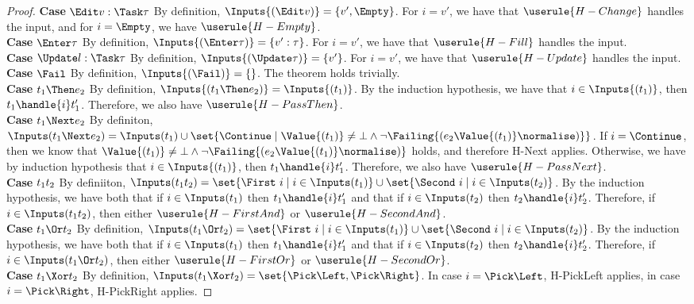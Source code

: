 \begin{proof}
  \noindent\textbf{Case} $\Edit v:\Task\tau$ By definition, $\Inputs{(\Edit v)}=\{v',\Empty\}$. For $i=v'$, we have that $\userule{H-Change}$ handles the input, and for $i=\Empty$, we have $\userule{H-Empty}$.\\

  \noindent\textbf{Case} $\Enter \tau$ By definition, $\Inputs{(\Enter \tau)}=\{v':\tau\}$. For $i=v'$, we have that $\userule{H-Fill}$ handles the input.\\

  \noindent\textbf{Case} $\Update l:\Task\tau$ By definition, $\Inputs{(\Update\tau)}=\{v'\}$. For $i=v'$, we have that $\userule{H-Update}$ handles the input.\\

  \noindent\textbf{Case} $\Fail$ By definition, $\Inputs{(\Fail)}=\{\}$. The theorem holds trivially.\\

  \noindent\textbf{Case} $t_1\Then e_2$ By definition, $\Inputs{(t_1\Then e_2)}=\Inputs{(t_1)}$. By the induction hypothesis, we have that $i\in\Inputs{(t_1)}$, then $t_1\handle{i}t_1'$. Therefore, we also have $\userule{H-PassThen}$.\\

  \noindent\textbf{Case} $t_1\Next e_2$ By definiton, $\Inputs(t_1 \Next e_2) = \Inputs(t_1) \cup \set{\Continue\mid \Value{(t_1)}\neq \bot \wedge \neg\Failing{(e_2 \Value{(t_1)}\normalise)}}$. If $i=\Continue$, then we know that $\Value{(t_1)}\neq \bot \wedge \neg\Failing{(e_2 \Value{(t_1)}\normalise)}$ holds, and therefore H-Next applies. Otherwise, we have by induction hypothesis that $i\in\Inputs{(t_1)}$, then $t_1\handle{i}t_1'$. Therefore, we also have $\userule{H-PassNext}$.\\

  \noindent\textbf{Case} $t_1\relax t_2$ By definiiton, $\Inputs(t_1\And t_2) = \set{\First\ i \mid i \in \Inputs(t_1)} \cup \set{\Second\ i \mid i \in \Inputs(t_2)}$. By the induction hypothesis, we have both that if $i\in\Inputs(t_1)$ then $t_1\handle{i}t_1'$ and that if $i\in\Inputs(t_2)$ then $t_2\handle{i}t_2'$. Therefore, if $i\in\Inputs(t_1\And t_2)$, then either $\userule{H-FirstAnd}$ or $\userule{H-SecondAnd}$.\\

  \noindent\textbf{Case} $t_1\Or t_2$ By definition, $\Inputs(t_1\Or t_2) = \set{\First\ i \mid i \in \Inputs(t_1)} \cup \set{\Second\ i \mid i \in \Inputs(t_2)}$. By the induction hypothesis, we have both that if $i\in\Inputs(t_1)$ then $t_1\handle{i}t_1'$ and that if $i\in\Inputs(t_2)$ then $t_2\handle{i}t_2'$. Therefore, if $i\in\Inputs(t_1\Or t_2)$, then either $\userule{H-FirstOr}$ or $\userule{H-SecondOr}$.\\

  \noindent\textbf{Case} $t_1\Xor t_2$ By definition, $\Inputs(t_1\Xor t_2) = \set{\Pick \Left, \Pick \Right}$. In case $i=\Pick\Left$, H-PickLeft applies, in case $i=\Pick\Right$, H-PickRight applies.

\end{proof}

